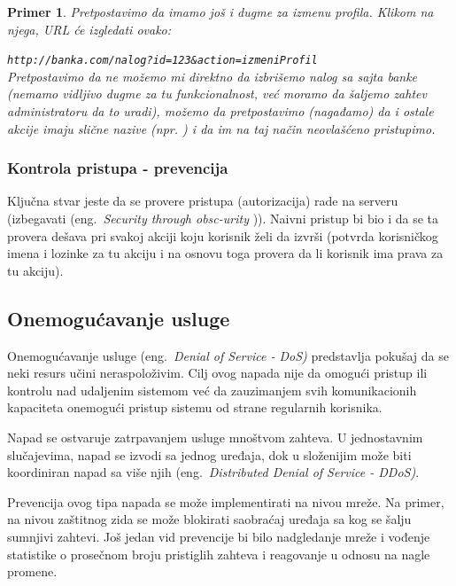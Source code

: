 \documentclass[a4paper]{article}
\newtheorem{primer}{Primer}[section]
\begin{document}
\begin{primer}
\label{primer4}
Pretpostavimo da imamo još i dugme za izmenu profila. Klikom na njega, URL će izgledati ovako:

\texttt{http://banka.com/nalog?id=123\&{}action=izmeniProfil}\\
Pretpostavimo da ne možemo mi direktno da izbrišemo nalog sa sajta banke (nemamo vidljivo dugme za tu funkcionalnost, već moramo da šaljemo zahtev administratoru da to uradi), možemo da pretpostavimo (nagađamo) da i ostale akcije imaju slične nazive (npr. ) i da im na taj način neovlašćeno pristupimo.\\
\end{primer}

\subsubsection{Kontrola pristupa - prevencija}

Ključna stvar jeste da se provere pristupa (autorizacija) rade na serveru (izbegavati (eng.~{\em Security through obsc-urity} \cite{AS})). Naivni pristup bi bio i da se ta provera dešava pri svakoj akciji koju korisnik želi da izvrši (potvrda korisničkog imena i lozinke za tu akciju i na osnovu toga provera da li korisnik ima prava za tu akciju).

\subsection{Onemogućavanje usluge}
Onemogućavanje usluge (eng.~{\em Denial of Service - DoS)} \cite{DoSM} predstavlja pokušaj da se neki resurs učini neraspoloživim. Cilj ovog napada nije da omogući pristup ili kontrolu nad udaljenim sistemom već da zauzimanjem svih komunikacionih kapaciteta onemogući pristup sistemu od strane regularnih korisnika.

Napad se ostvaruje zatrpavanjem usluge mnoštvom zahteva. U jednostavnim slučajevima, napad se izvodi sa jednog uređaja, dok u složenijim može biti koordiniran napad sa više njih (eng.~{\em Distributed Denial of Service - DDoS)}.

Prevencija ovog tipa napada se može implementirati na nivou mreže. Na primer, na nivou zaštitnog zida se može blokirati saobraćaj uređaja sa kog se šalju sumnjivi zahtevi. Još jedan vid prevencije bi bilo nadgledanje mreže i vođenje statistike o prosečnom broju pristiglih zahteva i reagovanje u odnosu na nagle promene.
\end{document}
